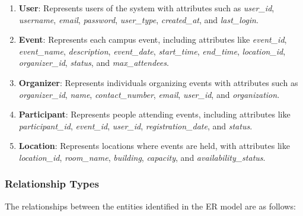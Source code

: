 \begin{enumerate}
    \item \textbf{User}: Represents users of the system with attributes such as \textit{user\_id}, \textit{username}, \textit{email}, \textit{password}, \textit{user\_type}, \textit{created\_at}, and \textit{last\_login}.
    \item \textbf{Event}: Represents each campus event, including attributes like \textit{event\_id}, \textit{event\_name}, \textit{description}, \textit{event\_date}, \textit{start\_time}, \textit{end\_time}, \textit{location\_id}, \textit{organizer\_id}, \textit{status}, and \textit{max\_attendees}.
    \item \textbf{Organizer}: Represents individuals organizing events with attributes such as \textit{organizer\_id}, \textit{name}, \textit{contact\_number}, \textit{email}, \textit{user\_id}, and \textit{organization}.
    \item \textbf{Participant}: Represents people attending events, including attributes like \textit{participant\_id}, \textit{event\_id}, \textit{user\_id}, \textit{registration\_date}, and \textit{status}.
    \item \textbf{Location}: Represents locations where events are held, with attributes like \textit{location\_id}, \textit{room\_name}, \textit{building}, \textit{capacity}, and \textit{availability\_status}.
\end{enumerate}

\subsubsection{Relationship Types}

The relationships between the entities identified in the ER model are as follows:

